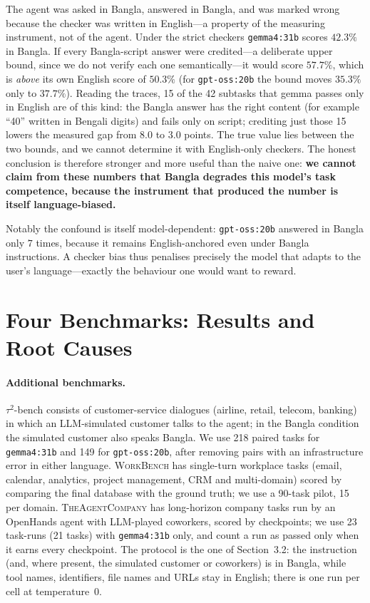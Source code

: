\documentclass[11pt]{article}
\begin{document}
The agent was asked in Bangla, answered in Bangla, and was marked wrong because the checker
was written in English---a property of the measuring instrument, not of the agent. Under the
strict checkers \texttt{gemma4:31b} scores $42.3\%$ in Bangla. If every Bangla-script answer were credited---a
deliberate upper bound, since we do not verify each one semantically---it would score $57.7\%$,
which is \emph{above} its own English score of $50.3\%$ (for \texttt{gpt-oss:20b} the bound
moves $35.3\%$ only to $37.7\%$). Reading the traces, 15 of the 42
subtasks that gemma passes only in English are of this kind: the Bangla answer has the right
content (for example ``40'' written in Bengali digits) and fails only on script; crediting just
those 15 lowers the measured gap from $8.0$ to $3.0$ points. The true value lies between the two
bounds, and we cannot determine it with English-only checkers. The honest conclusion is
therefore stronger and more useful than the naive one: \textbf{we cannot claim from these
numbers that Bangla degrades this model's task competence, because the instrument that produced
the number is itself language-biased.}

Notably the confound is itself model-dependent: \texttt{gpt-oss:20b} answered in Bangla only $7$
times, because it remains English-anchored even under Bangla instructions. A checker bias thus
penalises precisely the model that adapts to the user's language---exactly the behaviour one
would want to reward.

\section{Four Benchmarks: Results and Root Causes}
\label{sec:four}

\paragraph{Additional benchmarks.} $\tau^2$-bench \citep{barres2025tau2} consists of
customer-service dialogues (airline, retail, telecom, banking) in which an LLM-simulated
customer talks to the agent; in the Bangla condition the simulated customer also speaks Bangla.
We use 218 paired tasks for \texttt{gemma4:31b} and 149 for \texttt{gpt-oss:20b}, after removing
pairs with an infrastructure error in either language. \textsc{WorkBench}
\citep{styles2024workbench} has single-turn workplace tasks (email, calendar, analytics,
project management, CRM and multi-domain) scored by comparing the final database with the
ground truth; we use a 90-task pilot, 15 per domain. \textsc{TheAgentCompany}
\citep{xu2024theagentcompany} has long-horizon company tasks run by an OpenHands agent
\citep{wang2025openhands} with LLM-played coworkers, scored by checkpoints; we use 23
task-runs (21 tasks) with \texttt{gemma4:31b} only, and count a run as passed only when it
earns every checkpoint. The protocol is the one of Section~3.2: the instruction (and, where
present, the simulated customer or coworkers) is in Bangla, while tool names, identifiers, file
names and URLs stay in English; there is one run per cell at temperature~0.
\end{document}
